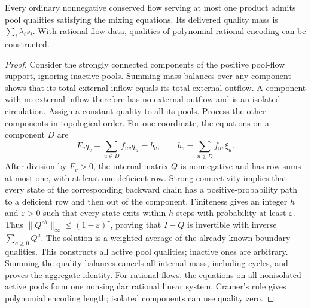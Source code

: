 \begin{lemma}\label{s1:cyclic-single}
Every ordinary nonnegative conserved flow serving at most one product
admits pool qualities satisfying the mixing equations. Its delivered
quality mass is $\sum_i\lambda_is_i$. With rational flow data,
qualities of polynomial rational encoding can be constructed.
\end{lemma}
\begin{proof}
Consider the strongly connected components of the positive pool-flow
support, ignoring inactive pools. Summing mass balances over any
component shows that its total external inflow equals its total external
outflow. A component with no external inflow therefore has no external
outflow and is an isolated circulation. Assign a constant quality to
all its pools. Process the other components in topological order.
For one coordinate, the equations on a component $D$ are
\[
 F_vq_v-\sum_{u\in D}f_{uv}q_u=b_v,\qquad
 b_v=\sum_{u\notin D}f_{uv}\xi_u.
\]
After division by $F_v>0$, the internal matrix $Q$ is nonnegative and
has row sums at most one, with at least one deficient row. Strong
connectivity implies that every state of the corresponding backward
chain has a positive-probability path to a deficient row and then out
of the component. Finiteness gives an integer $h$ and $\varepsilon>0$
such that every state exits within $h$ steps with probability at least
$\varepsilon$. Thus $\|Q^{rh}\|_\infty\le(1-\varepsilon)^r$, proving
that $I-Q$ is invertible with inverse $\sum_{a\ge0}Q^a$.
The solution is a weighted average of the already known boundary
qualities. This constructs all active pool qualities; inactive ones
are arbitrary. Summing the quality balances cancels all internal mass,
including cycles, and proves the aggregate identity.
For rational flows, the equations on all nonisolated active pools form
one nonsingular rational linear system. Cramer's rule gives polynomial
encoding length; isolated components can use quality zero.
\end{proof}

